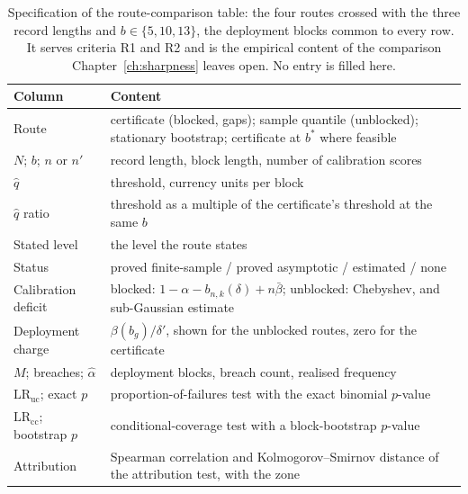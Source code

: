 \documentclass[../../../main.tex]{subfiles}
\begin{document}
\begin{table}[htbp]
\centering\small
\caption{Specification of the route-comparison table: the four routes crossed with the three record lengths and $b\in\{5,10,13\}$, the deployment blocks common to every row. It serves criteria R1 and R2 and is the empirical content of the comparison Chapter~\ref{ch:sharpness} leaves open. No entry is filled here.}
\label{tab:usd-routes}
\begin{tabular}{@{}ll@{}}
\toprule
Column & Content \\
\midrule
Route & certificate (blocked, gaps); sample quantile (unblocked); stationary bootstrap; certificate at $b^*$ where feasible \\
$N$; $b$; $n$ or $n'$ & record length, block length, number of calibration scores \\
$\hat q$ & threshold, currency units per block \\
$\hat q$ ratio & threshold as a multiple of the certificate's threshold at the same $b$ \\
Stated level & the level the route states \\
Status & proved finite-sample / proved asymptotic / estimated / none \\
Calibration deficit & blocked: $1-\alpha-b_{n,k}(\delta)+n\bar\beta$; unblocked: Chebyshev, and sub-Gaussian estimate \\
Deployment charge & $\beta(b_g)/\delta'$, shown for the unblocked routes, zero for the certificate \\
$M$; breaches; $\hat\alpha$ & deployment blocks, breach count, realised frequency \\
$\mathrm{LR}_{\mathrm{uc}}$; exact $p$ & proportion-of-failures test with the exact binomial $p$-value \\
$\mathrm{LR}_{\mathrm{cc}}$; bootstrap $p$ & conditional-coverage test with a block-bootstrap $p$-value \\
Attribution & Spearman correlation and Kolmogorov--Smirnov distance of the attribution test, with the zone \\
\bottomrule
\end{tabular}
\end{table}
\end{document}
